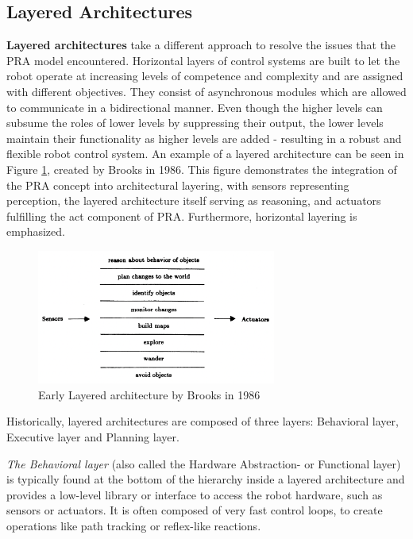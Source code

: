 \documentclass[%
paper=A4,               %
twoside=true,           %
openright,              %
11pt,                   %
bibliography=totoc,     %
titlepage=on,           %
DIV=12,                 %
BCOR=1.5cm,             %
parskip=half,            %
final
]{scrreprt}
\begin{document}
	\subsection{Layered Architectures}
	\textbf{Layered architectures} take a different approach to resolve the issues that the PRA model encountered. Horizontal layers of control systems are built to let the robot operate at increasing levels of competence and complexity and are assigned with different objectives. They consist of asynchronous modules which are allowed to communicate in a bidirectional manner. \autocite{brooksRobustLayeredControl1986} 
	Even though the higher levels can subsume the roles of lower levels by suppressing their output, the lower levels maintain their functionality as higher levels are added - resulting in a robust and flexible robot control system. \autocite{brooksRobustLayeredControl1986} An example of a layered architecture can be seen in Figure \ref{fig: fig2}, created by Brooks in 1986. \autocite{brooksRobustLayeredControl1986} This figure demonstrates the integration of the PRA concept into architectural layering, with sensors representing perception, the layered architecture itself serving as reasoning, and actuators fulfilling the act component of PRA. Furthermore, horizontal layering is emphasized. 
	

	\begin{figure}[ht]
		\centering
		\includegraphics[width=0.7\textwidth]{Graphics/LayeredArchitecture}
		\caption{Early Layered architecture by Brooks in 1986 \autocite{brooksRobustLayeredControl1986}}
		\label{fig: fig2}
	\end{figure}
	
	Historically, layered architectures are composed of three layers: Behavioral layer, Executive layer and Planning layer. \autocite{jun-youngjungThreelayeredHybridArchitecture2008,peterbonassoExperiencesArchitectureIntelligent1997}
	
	\textit{The Behavioral layer} (also called the Hardware Abstraction-  or Functional layer) is typically found at the bottom of the hierarchy inside a layered architecture and provides a low-level library or interface to access the robot hardware, such as sensors or actuators. \autocite{jun-youngjungThreelayeredHybridArchitecture2008,simmonsLayeredArchitectureCoordination2002} It is often composed of very fast control loops, to create operations like path tracking or reflex-like reactions. \autocite{schillingAutonomeSystemeUnd2023} 
	
\end{document}
